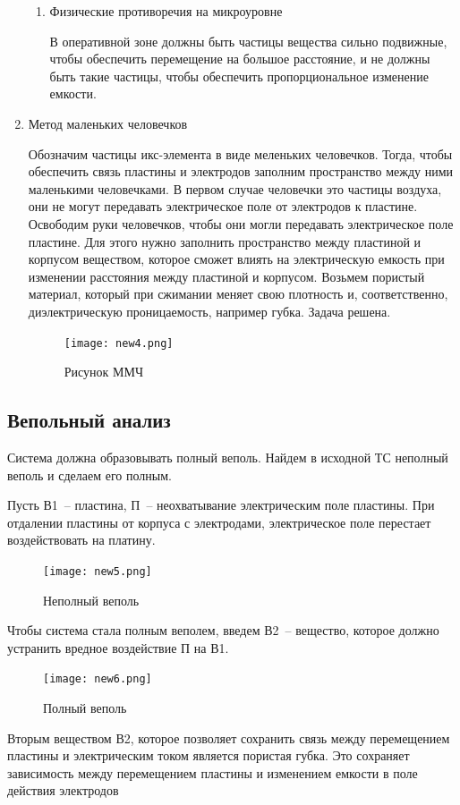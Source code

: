\begin{enumerate}[1]
\begin{enumerate}
		\item Физические противоречия на микроуровне

			В оперативной зоне должны быть частицы вещества сильно подвижные, чтобы обеспечить перемещение на большое расстояние, и не должны быть такие частицы, чтобы обеспечить пропорциональное изменение емкости.
	\end{enumerate}

	\item Метод маленьких человечков

Обозначим частицы икс-элемента в виде меленьких человечков. Тогда, чтобы обеспечить связь пластины и электродов заполним пространство между ними маленькими человечками. В первом случае человечки это частицы воздуха, они не могут передавать электрическое поле от электродов к пластине. Освободим руки человечков, чтобы они могли передавать электрическое поле пластине. Для этого нужно заполнить пространство между пластиной и корпусом веществом, которое сможет влиять на электрическую емкость при изменении расстояния между пластиной и корпусом. Возьмем пористый материал, который при сжимании меняет свою плотность и, соответственно, диэлектрическую проницаемость, например губка. Задача решена. 

\begin{figure}[h!]
	\centering
	\texttt{[image: new4.png]}
	\caption{Рисунок ММЧ}
	\label{new4}
\end{figure}

\end{enumerate}
\newpage
\subsection{Вепольный анализ}

Система должна образовывать полный веполь. Найдем в исходной ТС неполный веполь и сделаем его полным.

Пусть В1~-- пластина, П~-- неохватывание электрическим поле пластины. При отдалении пластины от корпуса с электродами, электрическое поле перестает воздействовать на платину.

\begin{figure}[h!]
	\centering
	\texttt{[image: new5.png]}
	\caption{Неполный веполь}
	\label{new5}
\end{figure}

Чтобы система стала полным веполем, введем В2~-- вещество, которое должно устранить вредное воздействие П на В1.

\begin{figure}[h!]
	\centering
	\texttt{[image: new6.png]}
	\caption{Полный веполь}
	\label{new6}
\end{figure}
\newpage
Вторым веществом В2, которое позволяет сохранить связь между перемещением пластины и электрическим током является пористая губка. Это сохраняет зависимость между перемещением пластины и изменением емкости в поле действия электродов

